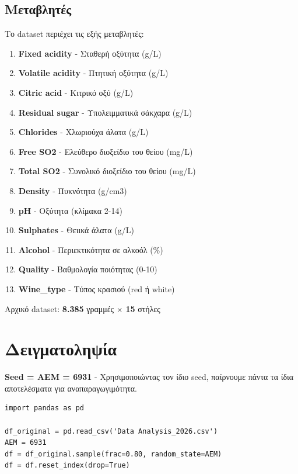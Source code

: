 \documentclass[12pt,a4paper]{article}
\begin{document}
\subsection{\textgreek{Μεταβλητές}}

\textgreek{Το dataset περιέχει τις εξής μεταβλητές:}

\begin{enumerate}
    \item \textbf{Fixed acidity} - \textgreek{Σταθερή οξύτητα (g/L)}
    \item \textbf{Volatile acidity} - \textgreek{Πτητική οξύτητα (g/L)}
    \item \textbf{Citric acid} - \textgreek{Κιτρικό οξύ (g/L)}
    \item \textbf{Residual sugar} - \textgreek{Υπολειμματικά σάκχαρα (g/L)}
    \item \textbf{Chlorides} - \textgreek{Χλωριούχα άλατα (g/L)}
    \item \textbf{Free SO2} - \textgreek{Ελεύθερο διοξείδιο του θείου (mg/L)}
    \item \textbf{Total SO2} - \textgreek{Συνολικό διοξείδιο του θείου (mg/L)}
    \item \textbf{Density} - \textgreek{Πυκνότητα (g/cm3)}
    \item \textbf{pH} - \textgreek{Οξύτητα (κλίμακα 2-14)}
    \item \textbf{Sulphates} - \textgreek{Θειικά άλατα (g/L)}
    \item \textbf{Alcohol} - \textgreek{Περιεκτικότητα σε αλκοόλ (\%)}
    \item \textbf{Quality} - \textgreek{Βαθμολογία ποιότητας (0-10)}
    \item \textbf{Wine\_type} - \textgreek{Τύπος κρασιού (red ή white)}
\end{enumerate}

\textgreek{Αρχικό dataset:} \textbf{8.385} \textgreek{γραμμές} $\times$ \textbf{15} \textgreek{στήλες}

\section{\textgreek{Δειγματοληψία}}

\textbf{Seed = AEM = 6931} - \textgreek{Χρησιμοποιώντας τον ίδιο seed, παίρνουμε πάντα τα ίδια αποτελέσματα για αναπαραγωγιμότητα.}

\begin{lstlisting}
import pandas as pd

df_original = pd.read_csv('Data Analysis_2026.csv')
AEM = 6931
df = df_original.sample(frac=0.80, random_state=AEM)
df = df.reset_index(drop=True)
\end{lstlisting}
\end{document}
